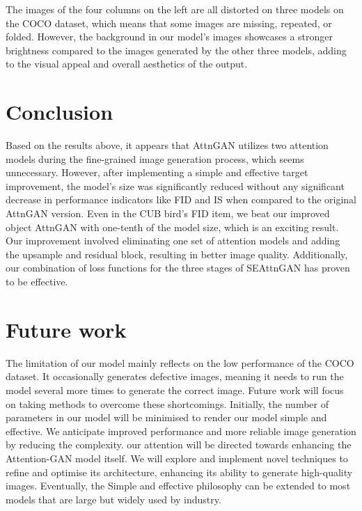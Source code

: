 \documentclass[runningheads, orivec]{llncs}
\begin{document}
The images of the four columns on the left are all distorted on three models on the COCO dataset, which means that some images are missing, repeated, or folded. However, the background in our model's images showcases a stronger brightness compared to the images generated by the other three models, adding to the visual appeal and overall aesthetics of the output.


\vspace{-10pt}
\section{Conclusion}
\vspace{-10pt}
Based on the results above, it appears that AttnGAN utilizes two attention models during the fine-grained image generation process, which seems unnecessary. However, after implementing a simple and effective target improvement, the model's size was significantly reduced without any significant decrease in performance indicators like FID and IS when compared to the original AttnGAN version. Even in the CUB bird's FID item, we beat our improved object AttnGAN with one-tenth of the model size, which is an exciting result. Our improvement involved eliminating one set of attention models and adding the upsample and residual block, resulting in better image quality. Additionally, our combination of loss functions for the three stages of SEAttnGAN has proven to be effective.
\vspace{-10pt}
\section{Future work}
\vspace{-8pt}
The limitation of our model mainly reflects on the low performance of the COCO dataset. It occasionally generates defective images, meaning it needs to run the model several more times to generate the correct image. Future work will focus on taking methods to overcome these shortcomings. Initially, the number of parameters in our model will be minimised to render our model simple and effective. We anticipate improved performance and more reliable image generation by reducing the complexity. our attention will be directed towards enhancing the Attention-GAN model itself. We will explore and implement novel techniques to refine and optimise its architecture, enhancing its ability to generate high-quality images. Eventually, the Simple and effective philosophy can be extended to most models that are large but widely used by industry.
\vspace{-10pt}
\end{document}
